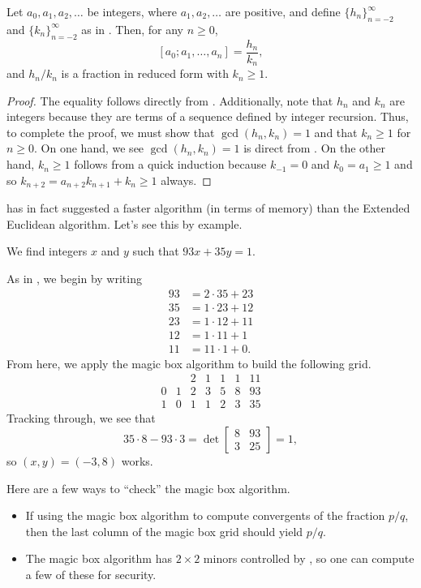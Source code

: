 \documentclass[../notes.tex]{subfiles}
\begin{document}
\begin{corollary} \label{cor:actual-convergents-magic-box}
	Let $a_0,a_1,a_2,\ldots$ be integers, where $a_1,a_2,\ldots$ are positive, and define $\{h_n\}_{n=-2}^\infty$ and $\{k_n\}_{n=-2}^\infty$ as in . Then, for any $n\ge0$,
	\[[a_0;a_1,\ldots,a_n]=\frac{h_n}{k_n},\]
	and $h_n/k_n$ is a fraction in reduced form with $k_n\ge1$.
\end{corollary}
\begin{proof}
	The equality follows directly from . Additionally, note that $h_n$ and $k_n$ are integers because they are terms of a sequence defined by integer recursion. Thus, to complete the proof, we must show that $\gcd(h_n,k_n)=1$ and that $k_n\ge1$ for $n\ge0$. On one hand, we see $\gcd(h_n,k_n)=1$ is direct from . On the other hand, $k_n\ge1$ follows from a quick induction because $k_{-1}=0$ and $k_0=a_1\ge1$ and so $k_{n+2}=a_{n+2}k_{n+1}+k_n\ge1$ always.
\end{proof}
 has in fact suggested a faster algorithm (in terms of memory) than the Extended Euclidean algorithm. Let's see this by example.
\begin{example}
	We find integers $x$ and $y$ such that $93x+35y=1$.
\end{example}
\begin{solution}
	As in , we begin by writing
	\begin{align*}
		93 &= 2\cdot35+23 \\
		35 &= 1\cdot23+12 \\
		23 &= 1\cdot12+11 \\
		12 &= 1\cdot11+1 \\
		11 &= 11\cdot1+0.
	\end{align*}
	From here, we apply the magic box algorithm  to build the following grid.
	\[\begin{array}{cc|ccccc}
		  &   & 2 & 1 & 1 & 1 & 11 \\\hline
		0 & 1 & 2 & 3 & 5 & 8 & 93 \\
		1 & 0 & 1 & 1 & 2 & 3 & 35
	\end{array}\]
	Tracking  through, we see that
	\[35\cdot8-93\cdot3=\det\begin{bmatrix}
		8 & 93 \\
		3 & 25
	\end{bmatrix}=1,\]
	so $(x,y)=(-3,8)$ works.
\end{solution}
\begin{remark}
	Here are a few ways to ``check'' the magic box algorithm.
	\begin{itemize}
		\item If using the magic box algorithm to compute convergents of the fraction $p/q$, then the last column of the magic box grid should yield $p/q$.
		\item The magic box algorithm has $2\times2$ minors controlled by , so one can compute a few of these for security.
	\end{itemize}
\end{remark}
\end{document}
